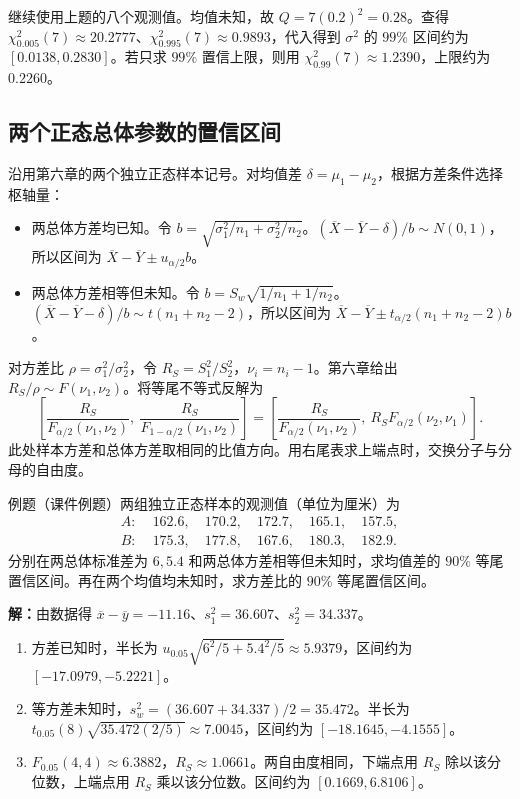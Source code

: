 \documentclass[UTF8,fontset=none,zihao=-4,a4paper]{ctexart}
\newcommand{\example}[1]{\begin{infobox}{例题}#1\end{infobox}}
\newcommand{\solution}{\par\noindent\textbf{解：}}
\begin{document}
继续使用上题的八个观测值。均值未知，故 $Q=7(0.2)^2=0.28$。查得 $\chi^2_{0.005}(7)\approx20.2777$、$\chi^2_{0.995}(7)\approx0.9893$，代入得到 $\sigma^2$ 的 $99\%$ 区间约为 $[0.0138,0.2830]$。若只求 $99\%$ 置信上限，则用 $\chi^2_{0.99}(7)\approx1.2390$，上限约为 $0.2260$。

\subsection{两个正态总体参数的置信区间}
沿用第六章的两个独立正态样本记号。对均值差 $\delta=\mu_1-\mu_2$，根据方差条件选择枢轴量：
\begin{itemize}
\item 两总体方差均已知。令 $b=\sqrt{\sigma_1^2/n_1+\sigma_2^2/n_2}$。$(\overline X-\overline Y-\delta)/b\sim N(0,1)$，所以区间为 $\overline X-\overline Y\pm u_{\alpha/2}b$。
\item 两总体方差相等但未知。令 $b=S_w\sqrt{1/n_1+1/n_2}$。$(\overline X-\overline Y-\delta)/b\sim t(n_1+n_2-2)$，所以区间为 $\overline X-\overline Y\pm t_{\alpha/2}(n_1+n_2-2)b$。
\end{itemize}

对方差比 $\rho=\sigma_1^2/\sigma_2^2$，令 $R_S=S_1^2/S_2^2$，$\nu_i=n_i-1$。第六章给出 $R_S/\rho\sim F(\nu_1,\nu_2)$。将等尾不等式反解为
\[
\left[\frac{R_S}{F_{\alpha/2}(\nu_1,\nu_2)},\
      \frac{R_S}{F_{1-\alpha/2}(\nu_1,\nu_2)}\right]
=\left[\frac{R_S}{F_{\alpha/2}(\nu_1,\nu_2)},\
      R_S F_{\alpha/2}(\nu_2,\nu_1)\right].
\]
此处样本方差和总体方差取相同的比值方向。用右尾表求上端点时，交换分子与分母的自由度。

\example{（课件例题）两组独立正态样本的观测值（单位为厘米）为
\[
\begin{aligned}
A:\;&162.6,\quad170.2,\quad172.7,\quad165.1,\quad157.5,\\
B:\;&175.3,\quad177.8,\quad167.6,\quad180.3,\quad182.9 .
\end{aligned}
\]
分别在两总体标准差为 $6,5.4$ 和两总体方差相等但未知时，求均值差的 $90\%$ 等尾置信区间。再在两个均值均未知时，求方差比的 $90\%$ 等尾置信区间。}
\solution 由数据得 $\overline x-\overline y=-11.16$、$s_1^2=36.607$、$s_2^2=34.337$。
\begin{enumerate}
\item 方差已知时，半长为 $u_{0.05}\sqrt{6^2/5+5.4^2/5}\approx5.9379$，区间约为 $[-17.0979,-5.2221]$。
\item 等方差未知时，$s_w^2=(36.607+34.337)/2=35.472$。半长为 $t_{0.05}(8)\sqrt{35.472(2/5)}\approx7.0045$，区间约为 $[-18.1645,-4.1555]$。
\item $F_{0.05}(4,4)\approx6.3882$，$R_S\approx1.0661$。两自由度相同，下端点用 $R_S$ 除以该分位数，上端点用 $R_S$ 乘以该分位数。区间约为 $[0.1669,6.8106]$。
\end{enumerate}
\end{document}
